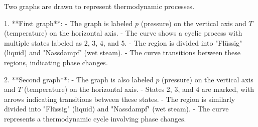Two graphs are drawn to represent thermodynamic processes.  

1. **First graph**:  
   - The graph is labeled \( p \) (pressure) on the vertical axis and \( T \) (temperature) on the horizontal axis.  
   - The curve shows a cyclic process with multiple states labeled as 2, 3, 4, and 5.  
   - The region is divided into "Flüssig" (liquid) and "Nassdampf" (wet steam).  
   - The curve transitions between these regions, indicating phase changes.  

2. **Second graph**:  
   - The graph is also labeled \( p \) (pressure) on the vertical axis and \( T \) (temperature) on the horizontal axis.  
   - States 2, 3, and 4 are marked, with arrows indicating transitions between these states.  
   - The region is similarly divided into "Flüssig" (liquid) and "Nassdampf" (wet steam).  
   - The curve represents a thermodynamic cycle involving phase changes.